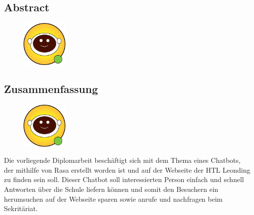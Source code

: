 \begin{spacing}{1}
    \chapter*{Abstract}
\end{spacing}
\begin{figure}
    \begin{center}
      \includegraphics[width=0.2\textwidth]{pics/leon.png}
    \end{center}
\end{figure}

\lipsum[6]
\newpage
\begin{spacing}{1}
    \chapter*{Zusammenfassung}
\end{spacing}
\begin{figure}
    \begin{center}
      \includegraphics[width=0.2\textwidth]{pics/leon.png}
    \end{center}
\end{figure}
Die vorliegende Diplomarbeit beschäftigt sich mit dem Thema eines Chatbots, der mithilfe von Rasa erstellt worden ist und auf der Webseite der HTL Leonding zu finden sein soll. Dieser Chatbot soll interessierten Person einfach und schnell Antworten über die Schule liefern können und somit den Besuchern ein herumsuchen auf der Webseite sparen sowie anrufe und nachfragen beim Sekritäriat.

